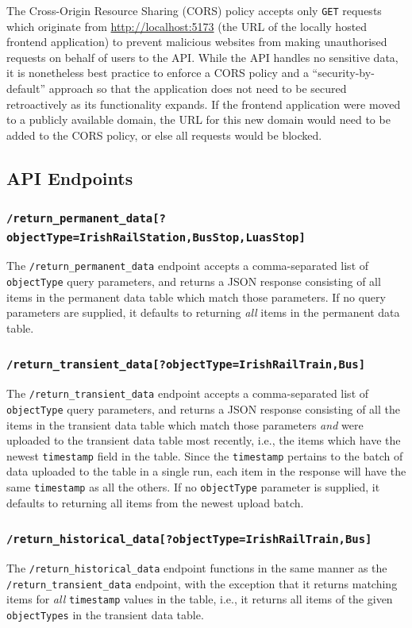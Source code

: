 \documentclass[a4paper,11pt]{report}
\begin{document}
The Cross-Origin Resource Sharing (CORS) policy accepts only \verb|GET| requests which originate from \url{http://localhost:5173} (the URL of the locally hosted frontend application) to prevent malicious websites from making unauthorised requests on behalf of users to the API.
While the API handles no sensitive data, it is nonetheless best practice to enforce a CORS policy and a ``security-by-default'' approach so that the application does not need to be secured retroactively as its functionality expands.
If the frontend application were moved to a publicly available domain, the URL for this new domain would need to be added to the CORS policy, or else all requests would be blocked.

\subsection{API Endpoints}
\subsubsection{\texttt{/return\_permanent\_data[?objectType=IrishRailStation,BusStop,LuasStop]}}
The \verb|/return_permanent_data| endpoint accepts a comma-separated list of \verb|objectType| query parameters, and returns a JSON response consisting of all items in the permanent data table which match those parameters.
If no query parameters are supplied, it defaults to returning \textit{all} items in the permanent data table.

\subsubsection{\texttt{/return\_transient\_data[?objectType=IrishRailTrain,Bus]}}
The \verb|/return_transient_data| endpoint accepts a comma-separated list of \verb|objectType| query parameters, and returns a JSON response consisting of all the items in the transient data table which match those parameters \textit{and} were uploaded to the transient data table most recently, i.e., the items which have the newest \verb|timestamp| field in the table.
Since the \verb|timestamp| pertains to the batch of data uploaded to the table in a single run, each item in the response will have the same \verb|timestamp| as all the others.
If no \verb|objectType| parameter is supplied, it defaults to returning all items from the newest upload batch. 

\subsubsection{\texttt{/return\_historical\_data[?objectType=IrishRailTrain,Bus]}}
The \verb|/return_historical_data| endpoint functions in the same manner as the \verb|/return_transient_data| endpoint, with the exception that it returns matching items for \textit{all} \verb|timestamp| values in the table, i.e., it returns all items of the given \verb|objectTypes| in the transient data table. 
\end{document}
